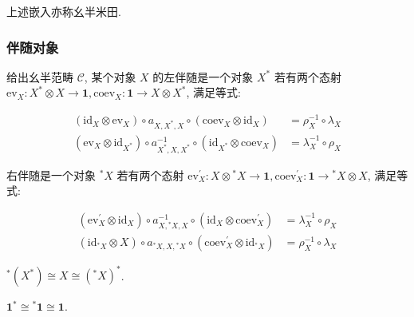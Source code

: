 上述嵌入亦称幺半米田.

\subsubsection{伴随对象}

\begin{definition}[伴随对象]
    给出幺半范畴 \(\mathcal{C}\), 某个对象 \(X\) 的左伴随是一个对象 \(X^\ast\) 若有两个态射 \(\mathrm{ev}_X : X^\ast \otimes X \to \mathbf{1}, \mathrm{coev}_X : \mathbf{1} \to X \otimes X^\ast\),
    满足等式:

    \[
        \begin{aligned}
            (\mathrm{id}_X \otimes \mathrm{ev}_X) \circ a_{X,X^\ast,X} \circ (\mathrm{coev}_X \otimes \mathrm{id}_X) &= \rho_X^{-1} \circ \lambda_X \\
            (\mathrm{ev}_X \otimes \mathrm{id}_{X^\ast}) \circ a_{X^\ast,X,X^\ast}^{-1} \circ (\mathrm{id}_{X^\ast} \otimes \mathrm{coev}_X) &= \lambda_X^{-1} \circ \rho_X 
        \end{aligned}
    \]

    右伴随是一个对象 \(^\ast X\) 若有两个态射 \(\mathrm{ev}^\prime_X : X \otimes {^\ast X} \to \mathbf{1}, \mathrm{coev}^\prime_X : \mathbf{1} \to {^\ast X} \otimes X\), 满足等式:

    \[
        \begin{aligned}
            (\mathrm{ev}^\prime_X \otimes \mathrm{id}_X) \circ a_{X,{^\ast X},X}^{-1} \circ (\mathrm{id}_X \otimes \mathrm{coev}^\prime_{X}) &= \lambda_X^{-1} \circ \rho_X \\
            (\mathrm{id}_{^\ast X} \otimes X) \circ a_{{^\ast X},X,{^\ast X}} \circ (\mathrm{coev}^\prime_X \otimes \mathrm{id}_{^\ast X}) &= \rho_X^{-1} \circ \lambda_X 
        \end{aligned}
    \]
\end{definition}

\begin{corollary}
    \({^\ast} (X^\ast) \cong X \cong {({^\ast} X)}^\ast\).
\end{corollary}

\begin{corollary}
    \(\mathbf{1}^\ast \cong {^\ast \mathbf{1}} \cong \mathbf{1}\).
\end{corollary}

